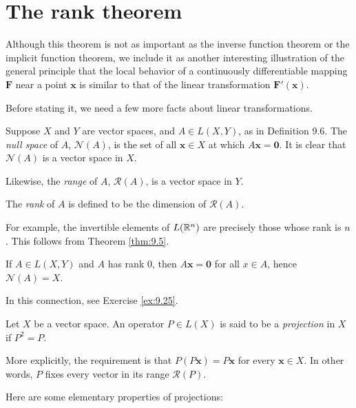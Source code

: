
\section{The rank theorem}

Although this theorem is not as important as the inverse function theorem or
the implicit function theorem, we include it as another interesting illustration
of the general principle that the local behavior of a continuously differentiable
mapping $\mathbf{F}$ near a point $\mathbf{x}$ is similar to that of the linear transformation $\mathbf{F'(x)}$.

Before stating it, we need a few more facts about linear transformations.

\begin{mydef}
    \label{mydef:9.30}
    Suppose $X$ and $Y$ are vector spaces, and $A \in L( X, Y)$, as in Definition 9.6.
    The \emph{null space} of $A$, $\mathscr{N}(A)$,
    is the set of all $\mathbf{x} \in X$ at which $A \mathbf{x = 0}$.
    It is clear that $\mathscr{N}(A)$ is a vector space in $X$.

    Likewise, the \emph{range} of $A$, $\mathscr{R}(A)$, is a vector space in $Y$.

    The \emph{rank} of $A$ is defined to be the dimension of $\mathscr{R}(A)$.

    For example, the invertible elements of $L({\protect\mathbb R}^n)$ are precisely those whose rank is $n$. This follows from Theorem \ref{thm:9.5}.

    If $A \in L(X, Y)$ and $A$ has rank 0,
    then $A \mathbf{x = 0}$ for all $x \in A$,
    hence $\mathscr{N}(A) = X$.

    In this connection, see Exercise \ref{ex:9.25}.
\end{mydef}

\begin{mydef}
    Let $X$ be a vector space. An operator $P\in L(X)$ is said to be
    a \emph{projection} in $X$ if $P^2 = P$.

    More explicitly, the requirement is that $P(P \mathbf{x}) = P \mathbf{x}$ for every $\mathbf{x} \in X$.
    In other words, $P$ fixes every vector in its range $\mathscr{R}(P)$.
\end{mydef}

Here are some elementary properties of projections:



